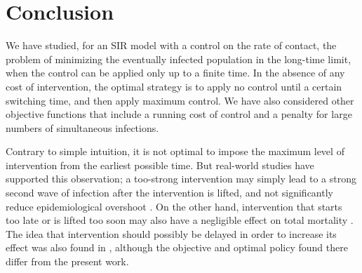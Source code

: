 \documentclass[english,12pt,letter]{article}
\newcommand{\Sinf}{x_\infty}
\begin{document}
\section{Conclusion\label{sec:conclusion}}
We have studied, for an SIR model with a control on the rate of contact, the
problem of minimizing the eventually infected population in the long-time limit,
when the control can be applied only up to a finite time.  In the absence of any
cost of intervention, the optimal strategy is to apply no control until a
certain switching time, and then apply maximum control.  We have also considered
other objective functions that include a running cost of control and a penalty for
large numbers of simultaneous infections.

Contrary to simple intuition, it is not optimal to impose the maximum
level of intervention from the earliest possible time.  But real-world
studies have supported this observation; a too-strong intervention
may simply lead to a strong second wave of infection after
the intervention is lifted, and not significantly reduce epidemiological
overshoot \cite{bootsma2007effect}.  On the other hand, intervention that
starts too late or is lifted too soon may also have a negligible
effect on total mortality \cite{bootsma2007effect,hatchett2007public,markel2007nonpharmaceutical}.
The idea that intervention should possibly be delayed in order to increase
its effect was also found in \cite{ballard2017intervention}, although 
the objective and optimal policy found there differ from the present work.

\end{document}
